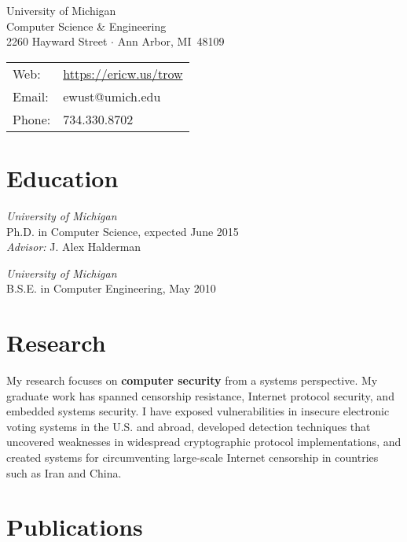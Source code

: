 \documentclass[margin,11pt]{res} %
\begin{document}
\begin{adjustwidth}{-1.3in}{0pt}
\vspace{20pt}

\noindent 
\parbox[m]{4in}{
University of Michigan\\
Computer Science \& Engineering\\
2260 Hayward Street $\cdot$ Ann Arbor, MI \,48109
}
\begin{tabular}{ll}
{Web}:&\url{https://ericw.us/trow}\\
{Email}:&ewust@umich.edu\\
{Phone}:& 734.330.8702
\end{tabular}
\vspace{10pt}
\end{adjustwidth}

\section{\large Education}

        \emph{University of Michigan}\\
        Ph.D. in Computer Science, expected June 2015\\
        \emph{Advisor:} J. Alex Halderman

        \emph{University of Michigan}\\
        B.S.E. in Computer Engineering, May 2010

\vspace{6pt}
\section{\large Research}

My research focuses on \textbf{computer security} from a systems perspective. My graduate work has spanned censorship resistance, Internet protocol security, and embedded systems security.
I have exposed vulnerabilities in insecure electronic voting systems in the U.S. and abroad, developed detection techniques that uncovered weaknesses in widespread cryptographic protocol implementations, and created systems for circumventing large-scale Internet censorship in countries such as Iran and China.

\vspace{6pt}
\section{\large Publications}
\end{document}
